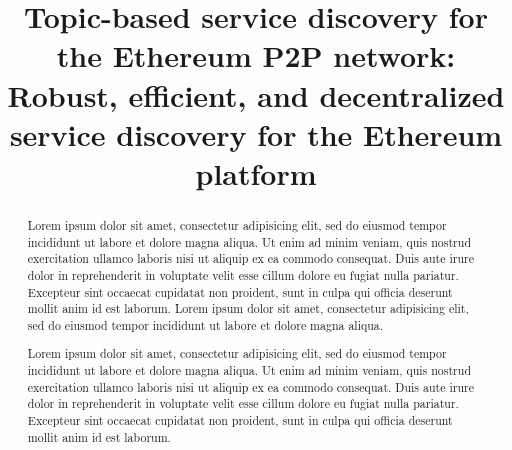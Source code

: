 \documentclass[conference]{IEEEtran}
\begin{document}
\title{Topic-based service discovery for the Ethereum P2P network}
\title{\sysname: Robust, efficient, and decentralized service discovery for the Ethereum platform}
\author{}
\maketitle

\begin{abstract}
  Lorem ipsum dolor sit amet, consectetur adipisicing elit, sed do eiusmod tempor incididunt ut labore et dolore magna aliqua. Ut enim ad minim veniam, quis nostrud exercitation ullamco laboris nisi ut aliquip ex ea commodo consequat. Duis aute irure dolor in reprehenderit in voluptate velit esse cillum dolore eu fugiat nulla pariatur. Excepteur sint occaecat cupidatat non proident, sunt in culpa qui officia deserunt mollit anim id est laborum. Lorem ipsum dolor sit amet, consectetur adipisicing elit, sed do eiusmod tempor incididunt ut labore et dolore magna aliqua.
  
  Lorem ipsum dolor sit amet, consectetur adipisicing elit, sed do eiusmod tempor incididunt ut labore et dolore magna aliqua. Ut enim ad minim veniam, quis nostrud exercitation ullamco laboris nisi ut aliquip ex ea commodo consequat. Duis aute irure dolor in reprehenderit in voluptate velit esse cillum dolore eu fugiat nulla pariatur. Excepteur sint occaecat cupidatat non proident, sunt in culpa qui officia deserunt mollit anim id est laborum.
  
  
%
%


\end{abstract}
\end{document}
